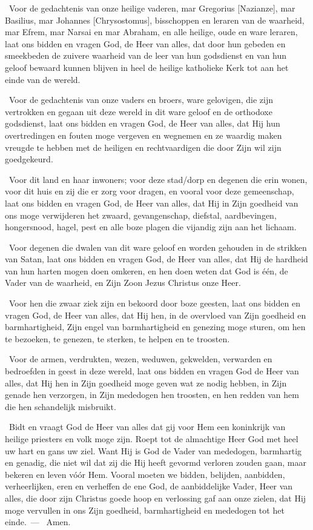 \documentclass[12pt,twoside,a5paper]{article}
\begin{document}
\begin{halfparskip}
  \dd~Voor de gedachtenis van onze heilige vaderen, mar Gregorius [Nazianze], mar Basilius, mar Johannes [Chrysostomus], bisschoppen en leraren van de waarheid, mar Efrem, mar Narsai en mar Abraham, en alle heilige, oude en ware leraren, laat ons bidden en vragen God, de Heer van alles, dat door hun gebeden en smeekbeden de zuivere waarheid van de leer van hun godsdienst en van hun geloof bewaard kunnen blijven in heel de heilige katholieke Kerk tot aan het einde van de wereld.

  \dd~Voor de gedachtenis van onze vaders en broers, ware gelovigen, die zijn vertrokken en gegaan uit deze wereld in dit ware geloof en de orthodoxe godsdienst, laat ons bidden en vragen God, de Heer van alles, dat Hij hun overtredingen en fouten moge vergeven en wegnemen en ze waardig maken vreugde te hebben met de heiligen en rechtvaardigen die door Zijn wil zijn goedgekeurd.

  \dd~Voor dit land en haar inwoners; voor deze stad/dorp en degenen die erin wonen, voor dit huis en zij die er zorg voor dragen, en vooral voor deze gemeenschap, laat ons bidden en vragen God, de Heer van alles, dat Hij in Zijn goedheid van ons moge verwijderen het zwaard, gevangenschap, diefstal, aardbevingen, hongersnood, hagel, pest en alle boze plagen die vijandig zijn aan het lichaam.

  \dd~Voor degenen die dwalen van dit ware geloof en worden gehouden in de strikken van Satan, laat ons bidden en vragen God, de Heer van alles, dat Hij de hardheid van hun harten mogen doen omkeren, en hen doen weten dat God is één, de Vader van de waarheid, en Zijn Zoon Jezus Christus onze Heer.

  \dd~Voor hen die zwaar ziek zijn en bekoord door boze geesten, laat ons bidden en vragen God, de Heer van alles, dat Hij hen, in de overvloed van Zijn goedheid en barmhartigheid, Zijn engel van barmhartigheid en genezing moge sturen, om hen te bezoeken, te genezen, te sterken, te helpen en te troosten.

  \dd~Voor de armen, verdrukten, wezen, weduwen, gekwelden, verwarden en bedroefden in geest in deze wereld, laat ons bidden en vragen God de Heer van alles, dat Hij hen in Zijn goedheid moge geven wat ze nodig hebben, in Zijn genade hen verzorgen, in Zijn mededogen hen troosten, en hen redden van hem die hen schandelijk misbruikt.

  \dd~Bidt en vraagt God de Heer van alles dat gij voor Hem een koninkrijk van heilige priesters en volk moge zijn. Roept tot de almachtige Heer God met heel uw hart en gans uw ziel. Want Hij is God de Vader van mededogen, barmhartig en genadig, die niet wil dat zij die Hij heeft gevormd verloren zouden gaan, maar bekeren en leven vóór Hem. Vooral moeten we bidden, belijden, aanbidden, verheerlijken, eren en verheffen de ene God, de aanbiddelijke Vader, Heer van alles, die door zijn Christus goede hoop en verlossing gaf aan onze zielen, dat Hij moge vervullen in ons Zijn goedheid, barmhartigheid en mededogen tot het einde.~--- \rr~Amen.
\end{halfparskip}
\end{document}
